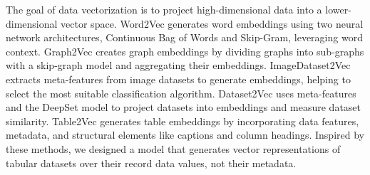 The goal of data vectorization is to project high-dimensional data into a lower-dimensional vector space. Word2Vec \cite{b8Word2Vec} generates word embeddings using two neural network architectures, Continuous Bag of Words and Skip-Gram, leveraging word context. Graph2Vec \cite{b9Graph2Vec} creates graph embeddings by dividing graphs into sub-graphs with a skip-graph model and aggregating their embeddings. ImageDataset2Vec \cite{b11Image2Vec} extracts meta-features from image datasets to generate embeddings, helping to select the most suitable classification algorithm. Dataset2Vec \cite{b12Dataset2Vec} uses meta-features and the DeepSet model to project datasets into embeddings and measure dataset similarity. Table2Vec \cite{b13Table2Vec} generates table embeddings by incorporating data features, metadata, and structural elements like captions and column headings. Inspired by these methods, we designed a model that generates vector representations of tabular datasets over their record data values, not their metadata.

